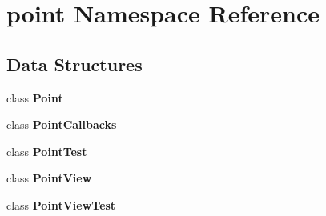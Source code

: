 \section{point Namespace Reference}
\label{namespacepoint}
\subsection*{Data Structures}
\begin{DoxyCompactItemize}
\item 
class {\bf Point}
\item 
class {\bf Point\+Callbacks}
\item 
class {\bf Point\+Test}
\item 
class {\bf Point\+View}
\item 
class {\bf Point\+View\+Test}
\end{DoxyCompactItemize}
